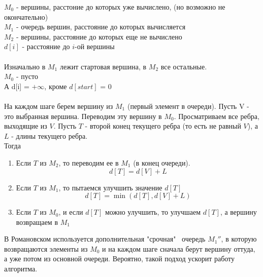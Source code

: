 \documentclass[discrete.tex]{subfiles}
\begin{document}
\begin{definition}
    $M_0 $  - вершины,
    расстоние до которых уже вычислено, (но возможно не окончательно)\\
    $M_1$ - очередь вершин, расстояние до которых вычисляется\\
    $M_2$ - вершины, расстояние до которых еще не вычислено\\
    $d[i]$ - расстояние до $i$-ой вершины\\
    \\
    Изначально в $M_1$ лежит стартовая вершина, в $M_2$ все остальные.\\
    $M_0$ - пусто\\
    А d[i] = $+\infty$, кроме $d[start]$ = 0\\
    \\
    На каждом шаге берем вершину из $M_1$ (первый элемент в очереди). Пусть V - 
    это выбранная вершина. Переводим эту вершину в $M_0$. Просматриваем все ребра, 
    выходящие из $V$. Пусть $T$ - второй конец текущего ребра (то есть не равный $V$), 
    а $L$ - длины текущего ребра.\\

    Тогда
    \begin{enumerate}
        \item Если $T$ из $M_2$, то переводим ее в $M_1$ (в конец очереди).
            \[d[T] = d[V] + L\]
        \item Если $T$ из $M_1$, то пытаемся улучшить значение $d[T]$
            \[d[T] = \min(d[T], d[V] + L)\]
        \item Если $T$ из $M_0$, и если $d[T]$ можно улучшить, то улучшаем $d[T]$, а 
            вершину возвращаем в $M_1$
    \end{enumerate}
    В Романовском используется дополнительная "срочная" \  очередь $M_1''$, в которую
    возвращаются элементы из $M_0$ и на каждом шаге сначала берут вершину оттуда, а уже 
    потом из основной очереди. Вероятно, такой подход ускорит работу алгоритма.
\end{definition}
\end{document}
